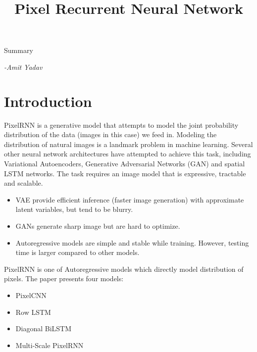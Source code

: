 \documentclass{article}
\title{Pixel Recurrent Neural Network}
\date{}
\begin{document}
\maketitle

\begin{center}
    \huge{Summary}
\end{center}
\begin{flushright}
    \it{-Amit Yadav}
\end{flushright}

\section*{Introduction}
PixelRNN is a generative model that attempts to model the joint probability distribution of the data (images in this case) we feed in. Modeling the distribution of natural images is a landmark problem in machine learning. Several other neural network architectures have attempted to achieve this task, including Variational Autoencoders, Generative Adversarial Networks (GAN) and spatial LSTM networks. The task requires an image model that is expressive, tractable and scalable.
\begin{itemize}
    \item VAE provide efficient inference (faster image generation) with approximate latent variables, but tend to be blurry.
    \item GANs generate sharp image but are hard to optimize.
    \item Autoregressive models are simple and stable while training. However, testing time is larger compared to other models.
\end{itemize}
PixelRNN is one of Autoregressive models which directly model distribution of pixels. The paper presents four models:
\begin{itemize}
    \item PixelCNN
    \item Row LSTM
    \item Diagonal BiLSTM
    \item Multi-Scale PixelRNN
\end{itemize}
\end{document}
